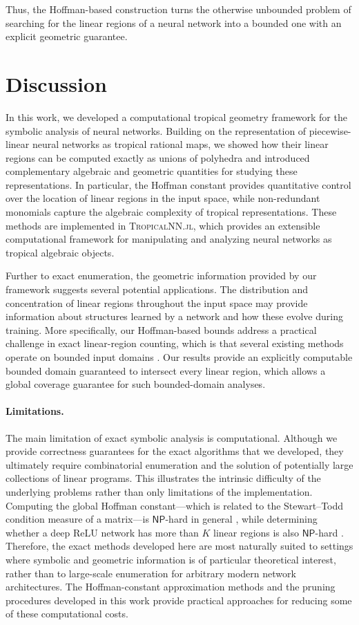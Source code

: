 \documentclass[10pt]{article}
\theoremstyle{definition}
\theoremstyle{remark}
\begin{document}
Thus, the Hoffman-based construction turns the otherwise unbounded problem of searching for the linear regions of a neural network into a bounded one with an explicit geometric guarantee.


\section{Discussion}

In this work, we developed a computational tropical geometry framework for the symbolic analysis of neural networks. Building on the representation of piecewise-linear neural networks as tropical rational maps, we showed how their linear regions can be computed exactly as unions of polyhedra and introduced complementary algebraic and geometric quantities for studying these representations. In particular, the Hoffman constant provides quantitative control over the location of linear regions in the input space, while non-redundant monomials capture the algebraic complexity of tropical representations. These methods are implemented in \textsc{TropicalNN.jl}, which provides an extensible computational framework for manipulating and analyzing neural networks as tropical algebraic objects.

Further to exact enumeration, the geometric information provided by our framework suggests several potential applications. The distribution and concentration of linear regions throughout the input space may provide information about structures learned by a network and how these evolve during training. More specifically, our Hoffman-based bounds address a practical challenge in exact linear-region counting, which is that several existing methods operate on bounded input domains \citep[e.g.,][]{humayun2023splinecam, serra2020empirical}. Our results provide an explicitly computable bounded domain guaranteed to intersect every linear region, which allows a global coverage guarantee for such bounded-domain analyses.

\paragraph{Limitations.} The main limitation of exact symbolic analysis is computational. Although we provide correctness guarantees for the exact algorithms that we developed, they ultimately require combinatorial enumeration and the solution of potentially large collections of linear programs. This illustrates the intrinsic difficulty of the underlying problems rather than only limitations of the implementation. Computing the global Hoffman constant---which is related to the Stewart--Todd condition measure of a matrix---is $\mathsf{NP}$-hard in general \citep{pena2024easily}, while determining whether a deep ReLU network has more than $K$ linear regions is also $\mathsf{NP}$-hard \citep{wang2022estimation}. Therefore, the exact methods developed here are most naturally suited to settings where symbolic and geometric information is of particular theoretical interest, rather than to large-scale enumeration for arbitrary modern network architectures. The Hoffman-constant approximation methods and the pruning procedures developed in this work provide practical approaches for reducing some of these computational costs.
\end{document}
